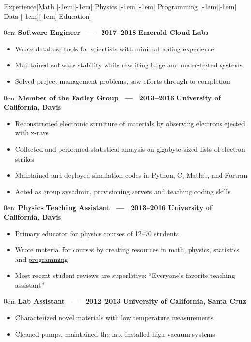 \documentclass[11pt,a4paper]{article}
\newenvironment{headedsection}[2]{
    \begin{addmargin}[0.5em]{0em}
    {\large\bfseries #1} \hfill {\bfseries #2}%
    \begin{itemize}
        [label={}, topsep=0pt, itemsep=1.5pt, parsep=0pt, leftmargin=1.5em]
}{
    \end{itemize}
    \end{addmargin}
    \medskip
}
\newcommand*\sbull{\raisebox{-0.550ex}[-1em][-1em]{\textscale{4}{\( \cdot \)}}\xspace}
\begin{document}
\sloppy  %


\vspace{1em}

\begin{mysection}{Experience}[Math \sbull Physics \sbull Programming \sbull Data \sbull Education]

    \begin{headedsection}{Software Engineer \ --- \ 2017--2018}{Emerald Cloud Labs}
        \item Wrote database tools for scientists with minimal coding experience
        \item Maintained software stability while rewriting large and under-tested systems
        \item Solved project management problems, saw efforts through to completion
    \end{headedsection}

\begin{headedsection}
          {Member of the \href{http://www.physics.ucdavis.edu/fadleygroup/}{Fadley Group} \ --- \ 2013--2016}
          {University of California, Davis}

        \item Reconstructed electronic structure of materials by observing electrons ejected with x-rays
        \item Collected and performed statistical analysis on gigabyte-sized lists of electron strikes
        \item Maintained and deployed simulation codes in Python, C, Matlab, and Fortran
        \item Acted as group sysadmin, provisioning servers and teaching coding skills
    \end{headedsection}

    \begin{headedsection}
          {Physics Teaching Assistant  \ --- \ 2013--2016}
          {University of California, Davis}

        \item Primary educator for physics courses of 12--70 students
        \item Wrote material for courses by creating resources in math, physics, statistics and \href{https://github.com/jgarst/AdvancedLab/releases/download/spring_2016/Python-FirstSteps.pdf}{programming}
        \item Most recent student reviews are superlative: ``Everyone's favorite teaching assistant''
    \end{headedsection}

    \begin{headedsection}
          {Lab Assistant \ --- \ 2012--2013}
          {University of California, Santa Cruz}

        \item Characterized novel materials with low temperature measurements
        \item Cleaned pumps, maintained the lab, installed high vacuum systems
    \end{headedsection}
\end{mysection}
\end{document}
